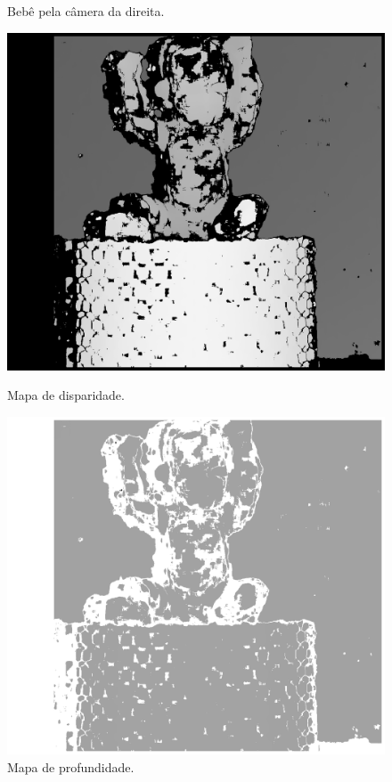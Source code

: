 \documentclass{bmvc2k}
\begin{document}
\begin{figure}[htb]
\begin{minipage}[t]{0.2\textwidth}
  \caption{Bebê pela câmera da direita.}
  \label{fig:babyR}
\end{minipage}\hfill
\begin{minipage}[t]{0.2\textwidth}
  \centering
  \includegraphics[width=\linewidth]{figs/baby_disp.png}
  \caption{Mapa de disparidade.}
  \label{fig:baby_disp}
\end{minipage}\hfill
\begin{minipage}[t]{0.2\textwidth}
  \centering
  \includegraphics[width=\linewidth]{figs/baby_depth.png}
  \caption{Mapa de profundidade.}
  \label{fig:baby_depth}
\end{minipage}
\end{figure}
\end{document}
